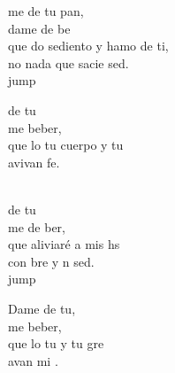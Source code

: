 \begin{cancion}%
	me de tu pan,\\
	dame de be\\
	que do sediento y hamo de ti,\\
	no  nada que sacie  sed.\\jump\\
	\begin{chorus}%
	de tu \\
	me  beber,\\
	que lo tu cuerpo y tu   \\
	avivan  fe.\\
	\end{chorus}%
	\jump\\
	de tu \\
	me de ber,\\
	que  aliviaré a mis hs\\
	con bre y n sed.\\jump\\
	\begin{chorus}%
	Dame de tu,\\
	me  beber,\\
	que lo tu  y tu gre\\
	avan mi .\\
	\end{chorus}%
	\jump\\
\end{cancion}%
